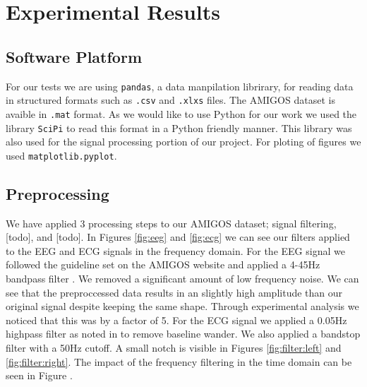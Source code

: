 \section{Experimental Results}
\subsection{Software Platform}
For our tests we are using \texttt{pandas},
a data manpilation librirary,
for reading data in structured formats such as
\texttt{.csv} and \texttt{.xlxs} files.
The AMIGOS dataset is avaible in \texttt{.mat} format.
As we would like to use Python for our work we used
the library \texttt{SciPi} to read this format in a Python friendly manner.
This library was also used for the signal processing portion of our project.
For ploting of figures we used \texttt{matplotlib.pyplot}.


\FloatBarrier
\subsection{Preprocessing}
We have applied 3 processing steps to our AMIGOS dataset;
signal filtering, [todo], and [todo].
In Figures \ref{fig:eeg} and \ref{fig:ecg}
we can see our filters applied to the EEG and ECG signals in the frequency domain.
For the EEG signal we followed the guideline set on the AMIGOS
website and applied a 4-45Hz bandpass filter \cite{AMIGOS:2018}.
We removed a significant amount of low frequency noise.
We can see that the preproccessed data results
in an slightly high amplitude than our original signal despite keeping the same shape.
Through experimental analysis we noticed that this was by a factor of 5.
For the ECG signal we applied a 0.05Hz highpass filter as noted in
\cite{SantamariaGranados:2019}
to remove baseline wander.
We also applied a bandstop filter with a 50Hz cutoff.
A small notch is visible in
Figures \ref{fig:filter:left} and \ref{fig:filter:right}.
The impact of the frequency filtering in the time domain can be seen in Figure
\label{fig:ecg:time}.

\clearpage
